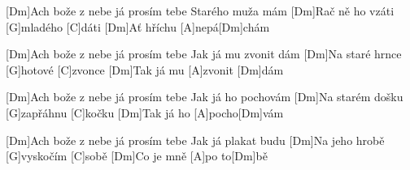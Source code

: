 
[Dm]Ach bože z nebe já prosím tebe
Starého muža mám
[Dm]Rač ně ho vzáti [G]mladého [C]dáti
[Dm]Ať hříchu [A]nepá[Dm]chám

[Dm]Ach bože z nebe já prosím tebe
Jak já mu zvonit dám
[Dm]Na staré hrnce [G]hotové [C]zvonce
[Dm]Tak já mu [A]zvonit [Dm]dám

[Dm]Ach bože z nebe já prosím tebe
Jak já ho pochovám
[Dm]Na starém došku [G]zapřáhnu [C]kočku
[Dm]Tak já ho [A]pocho[Dm]vám

[Dm]Ach bože z nebe já prosím tebe
Jak já plakat budu
[Dm]Na jeho hrobě [G]vyskočím [C]sobě
[Dm]Co je mně [A]po to[Dm]bě
